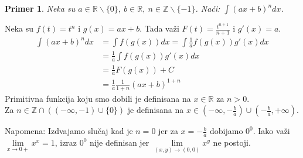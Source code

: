 \documentclass{article}
\newtheorem{prim}{Primer}[section]
\begin{document}
\begin{primbox}
    \begin{prim}
        Neka su $a \in \mathbb{R}\backslash\{0\},\ b\in\mathbb{R},\ n \in \mathbb{Z}\backslash\{-1\}$. Naći: $\int(ax + b)^ndx$.
    \end{prim}
    Neka su $f(t) = t^n$ i $g(x) = ax+b$. Tada važi $F(t) = \frac{t^{n+1}}{n+1}$ i $g'(x) = a$.
    \begin{align*}
        \int(ax + b)^ndx & = \int f(g(x))dx = \int\frac{1}{a}f(g(x))g'(x)dx
        \\ & = \frac{1}{a}\int f(g(x))g'(x)dx
        \\ & = \frac{1}{a}F(g(x)) + C
        \\ & = \frac{1}{a}\frac{1}{1+n}(ax + b)^{1+n}
    \end{align*}
    Primitivna funkcija koju smo dobili je definisana na $x \in \mathbb{R}$ za $n > 0$.\\
    Za $n\in \mathbb{Z} \cap ((-\infty, -1)\cup\{0\})$ je definisana na $x \in (-\infty, -\frac{b}{a})\cup(-\frac{b}{a}, +\infty)$.\par
    Napomena: Izdvajamo slučaj kad je $n=0$ jer za $x=-\frac{b}{a}$ dobijamo $0^0$. Iako važi $\lim\limits_{x\longrightarrow0+}x^x = 1$, izraz
    $0^0$ nije definisan jer $\lim\limits_{(x, y)\longrightarrow(0,0)} x^y$ ne postoji.
\end{primbox}
\end{document}
